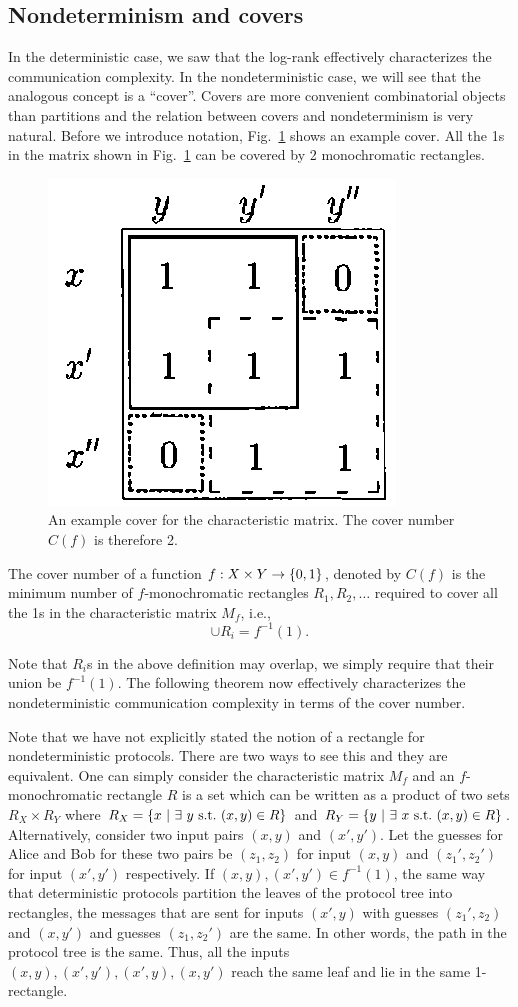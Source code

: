 \documentclass[letterpaper]{article}
\providecommand\cbrac[1]{\ensuremath \left\{#1\right\}}
\newcommand{\X}{X}
\newcommand{\Y}{Y}
\newcommand{\mf}{M_f}
\newcommand{\cf}{C(f)}
\begin{document}
\subsection{Nondeterminism and covers}

In the deterministic case, we saw that the log-rank effectively characterizes the communication complexity. In the nondeterministic case, we will see that the analogous concept is a ``cover''. Covers are more convenient combinatorial objects than partitions and the relation between covers and nondeterminism is very natural. Before we introduce notation, Fig.~\ref{fig:cover_example} shows an example cover. All the 1s in the matrix shown in Fig.~\ref{fig:cover_example} can be covered by 2 monochromatic rectangles.
\begin{figure}
\centering
\includegraphics[width=0.3 \textwidth]{cover_example}
\caption{An example cover for the characteristic matrix. The cover number $\cf$ is therefore 2.}
\label{fig:cover_example}
\end{figure}

\begin{definition}
The cover number of a function $f : \X \times \Y \to \cbrac{0,1}$, denoted by $\cf$ is the minimum number of $f$-monochromatic rectangles $R_1, R_2, \ldots$ required to cover all the 1s in the characteristic matrix $\mf$, i.e.,
$$
\cup R_i = f^{-1}(1).
$$
\end{definition}
Note that $R_i$s in the above definition may overlap, we simply require that their union be $f^{-1}(1)$. The following theorem now effectively characterizes the nondeterministic communication complexity in terms of the cover number.

Note that we have not explicitly stated the notion of a rectangle for nondeterministic protocols. There are two ways to see this and they are equivalent. One can simply consider the characteristic matrix $\mf$ and an $f$-monochromatic rectangle $R$ is a set which can be written as a product of two sets $R_X \times R_Y$ where $R_X = \cbrac{ x\ |\ \exists\ y\ \mathrm{s.t.}\ (x,y) \in R}$ and $R_Y = \cbrac{ y\ |\ \exists\ x\ \mathrm{s.t.}\ (x,y) \in R}$. Alternatively, consider two input pairs $(x,y)$ and $(x', y')$. Let the guesses for Alice and Bob for these two pairs be $(z_1, z_2)$ for input $(x,y)$ and $(z_1', z_2')$ for input $(x',y')$ respectively. If $(x,y), (x',y') \in f^{-1}(1)$, the same way that deterministic protocols partition the leaves of the protocol tree into rectangles, the messages that are sent for inputs $(x',y)$ with guesses $(z_1', z_2)$ and $(x,y')$ and guesses $(z_1, z_2')$ are the same. In other words, the path in the protocol tree is the same. Thus, all the inputs $(x,y), (x',y'), (x',y), (x,y')$ reach the same leaf and lie in the same 1-rectangle.
\end{document}
